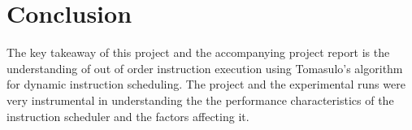 \section{Conclusion}
The key takeaway of this project and the accompanying project report is the understanding of out of order instruction execution using Tomasulo's algorithm for dynamic instruction scheduling. The project and the experimental runs were very instrumental in understanding the the performance characteristics of the instruction scheduler and the factors affecting it.